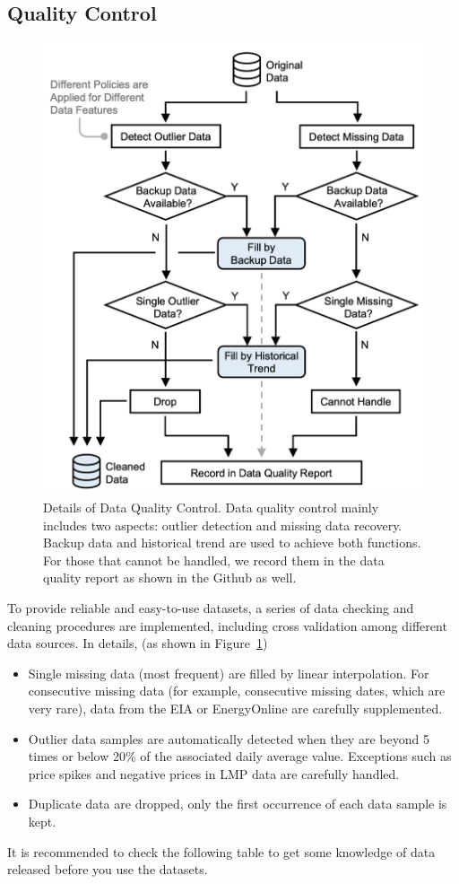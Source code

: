 \documentclass[11pt]{article}
\numberwithin{equation}{section}
\numberwithin{table}{section}
\numberwithin{figure}{section}
\begin{document}
\subsection{Quality Control}
\begin{figure}[htbp]
	\centering
	\includegraphics[width=.8\textwidth]{figures/data-quality-control.png}
	\caption{Details of Data Quality Control. Data quality control mainly includes two aspects: outlier detection and missing data recovery. Backup data and historical trend are used to achieve both functions. For those that cannot be handled, we record them in the data quality report as shown in the Github as well.}
	\label{fig:dataqualitycontrol}
\end{figure}
To provide reliable and easy-to-use datasets, a series of data checking and cleaning procedures are implemented, including cross validation	among different data sources. 
In details, (as shown in Figure~\ref{fig:dataqualitycontrol})
\begin{itemize}
	\item Single missing data (most frequent) are filled by linear interpolation. For consecutive missing data (for example, consecutive missing dates, which are very rare), data from the EIA or EnergyOnline are carefully supplemented.
	\item Outlier data samples are automatically detected when they are beyond 5 times or below 20\% of the associated daily average value. Exceptions such as price spikes and negative prices in LMP data are carefully handled.
	\item Duplicate data are dropped, only the first occurrence of each data sample is kept.
\end{itemize}
It is recommended to check the following table to get some knowledge of data released before you use the datasets.
\end{document}
